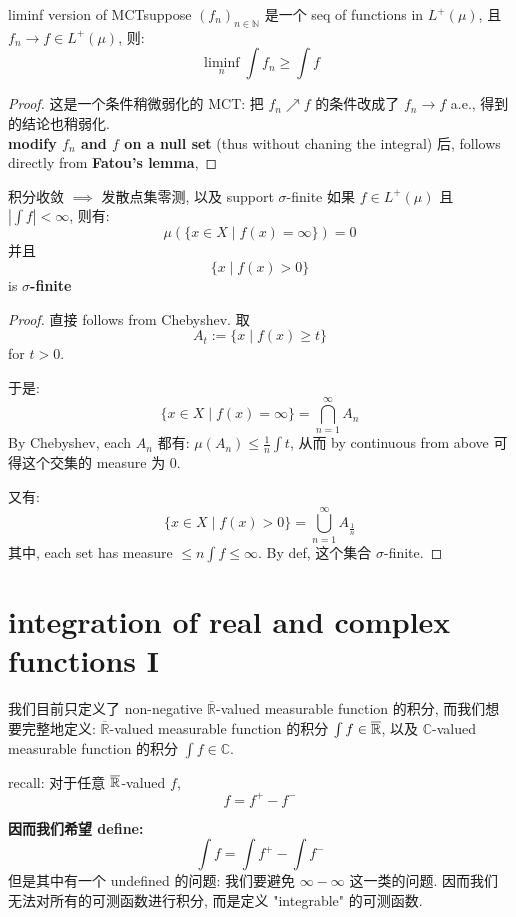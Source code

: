 \documentclass[lang=cn,11pt]{elegantbook}
\begin{document}
\begin{corollary}{liminf version of MCT}suppose $(f_n)_{n\in\mathbb{N}} $ 是一个 seq of functions in $L^+(\mu)$, 且 $f_n \rightarrow f \in L^+(\mu)$, 则:
$$
\liminf_n \int f_n \geq \int f
$$
\end{corollary}
\begin{proof}
    这是一个条件稍微弱化的 MCT: 把 $f_n\nearrow f$ 的条件改成了 $f_n \rightarrow f$ a.e., 得到的结论也稍弱化.\\
   \textbf{ modify $f_n$ and $f$ on a null set} (thus without chaning the integral) 后, follows directly from \textbf{Fatou's lemma}, 
\end{proof}


\begin{theorem}{积分收敛 $\implies$ 发散点集零测, 以及 support $\sigma$-finite}
    如果 $f\in L^+(\mu)$ 且 $|\int f| < \infty$, 则有: \[   \mu( \{x\in X \mid f(x) = \infty\} ) = 0\] 并且 \[ \{ x \mid f(x) > 0  \}\] is \textbf{$\sigma$-finite}
\end{theorem}

\begin{proof}
    直接 follows from Chebyshev. 取 \[ A_t := \{ x \mid f(x) \geq t\}\] for $t > 0 $.

于是: \[ \{x\in X \mid f(x) = \infty\}  = \bigcap_{n=1}^\infty A_n  \]
By Chebyshev, each $A_n$ 都有: $\mu(A_n) \leq \frac{1}{n} \int t$, 从而 by continuous from above 可得这个交集的 measure 为 0.

又有:\[ \{x\in X \mid f(x) >0 \} = \bigcup_{n=1}^\infty A_{\frac{1}{n}} \]
其中, each set has measure $\leq n\int f \leq \infty$. By def, 这个集合 $\sigma$-finite.
\end{proof}



\chapter{integration of real and complex functions I}

我们目前只定义了 non-negative $\overline{\mathbb{R}}$-valued measurable function 的积分, 而我们想要完整地定义: $\overline{\mathbb{R}}$-valued measurable function 的积分 $\int f \in \overline{\mathbb{R}}$, 以及 $\mathbb{C}$-valued  measurable function 的积分 $\int f \in \mathbb{C}$.

recall: 对于任意 $\overline{\mathbb{R}}$-valued $f$, \[f = f^+ - f^-\]

\textbf{因而我们希望 define:}\[ \int f = \int f^+ -\int f^-\]
但是其中有一个 undefined 的问题: 我们要避免 $\infty - \infty$ 这一类的问题. 因而我们无法对所有的可测函数进行积分, 而是定义 "integrable" 的可测函数.
\end{document}
